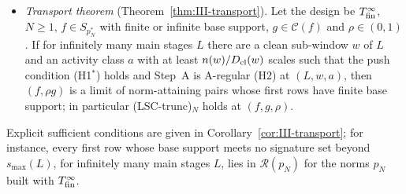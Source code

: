 \documentclass[10pt]{amsart}
\theoremstyle{definition}
\theoremstyle{remark}
\newcommand{\Cset}{\mathcal C}
\newcommand{\Rec}{\mathcal R}
\begin{document}
\begin{itemize}
\item[] \emph{Transport theorem} (Theorem~\ref{thm:III-transport}).  Let
the design be $T^\infty_{\rm fin}$, $N\ge1$, $f\in S_{p_N^*}$ with finite
or infinite base support, $g\in\Cset(f)$ and $\rho\in(0,1)$.  If for
infinitely many main stages $L$ there are a clean sub-window $w$ of $L$ and
an activity class $a$ with at least $n(w)/D_{\rm cl}(w)$ scales such that
the push condition (H1$^*$) holds and Step~A is A-regular (H2) at
$(L,w,a)$, then $(f,\rho g)$ is a limit of norm-attaining
pairs whose first rows have finite base support; in particular
\textup{(LSC-trunc)$_N$} holds at $(f,g,\rho)$.
\end{itemize}

Explicit sufficient conditions are given in
Corollary~\ref{cor:III-transport}; for instance, every first row whose base
support meets no signature set beyond $s_{\max}(L)$, for infinitely many
main stages $L$, lies in $\Rec(p_N)$ for the norms $p_N$ built with
$T^\infty_{\rm fin}$.
\end{document}
